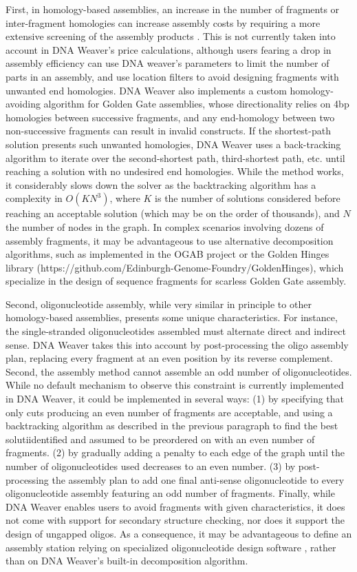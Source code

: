 First, in homology-based assemblies, an increase in the number of fragments or inter-fragment homologies can increase assembly costs by requiring a more extensive screening of the assembly products \citep{Potapov2018, Schlichting2019}. This is not currently taken into account in DNA Weaver's price calculations, although users fearing a drop in assembly efficiency can use DNA weaver's parameters to limit the number of parts in an assembly, and use location filters to avoid designing fragments with unwanted end homologies.
DNA Weaver also implements a custom homology-avoiding algorithm for Golden Gate assemblies, whose directionality relies on 4bp homologies between successive fragments, and any end-homology between two non-successive fragments can result in invalid constructs. If the shortest-path solution presents such unwanted homologies, DNA Weaver uses a back-tracking algorithm \citep{Yen1971} to iterate over the second-shortest path, third-shortest path, etc. until reaching a solution with no undesired end homologies. While the method works, it considerably slows down the solver as the backtracking algorithm has a complexity in $O(KN^3)$, where $K$ is the number of solutions considered before reaching an acceptable solution (which may be on the order of thousands), and $N$ the number of nodes in the graph. In complex scenarios involving dozens of assembly fragments, it may be advantageous to use alternative decomposition algorithms, such as implemented in the OGAB project \citep{Tsuge2015} or the Golden Hinges library (https://github.com/Edinburgh-Genome-Foundry/GoldenHinges), which specialize in the design of sequence fragments for scarless Golden Gate assembly.

Second, oligonucleotide assembly, while very similar in principle to other homology-based assemblies, presents some unique characteristics. For instance, the single-stranded oligonucleotides assembled must alternate direct and indirect sense. DNA Weaver takes this into account by post-processing the oligo assembly plan, replacing every fragment at an even position by its reverse complement. Second, the assembly method cannot assemble an odd number of oligonucleotides. While no default mechanism to observe this constraint is currently implemented in DNA Weaver, it could be implemented in several ways: (1) by specifying that only cuts producing an even number of fragments are acceptable, and using a backtracking algorithm as described in the previous paragraph to find the best solutiidentified and assumed to be preordered on with an even number of fragments. (2) by gradually adding a penalty to each edge of the graph until the number of oligonucleotides used decreases to an even number. (3) by post-processing the assembly plan to add one final anti-sense oligonucleotide to every oligonucleotide assembly featuring an odd number of fragments. Finally, while DNA Weaver enables users to avoid fragments with given characteristics, it does not come with support for secondary structure checking, nor does it support the design of ungapped oligos. As a consequence, it may be advantageous to define an assembly station relying on specialized oligonucleotide design software \citep{Richardson2006, Rydzanicz2005}, rather than on DNA Weaver's built-in decomposition algorithm.

